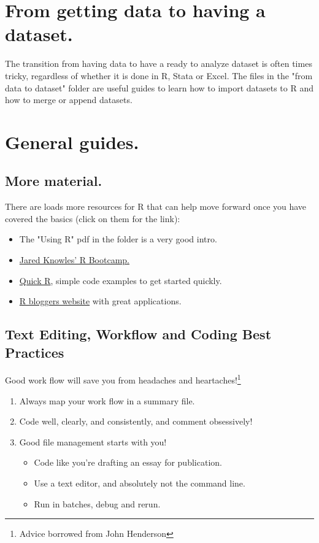 \documentclass[11pt,a4paper]{article}
\begin{document}
\section{From getting data to having a dataset.}
The transition from having data to have a ready to analyze dataset is often times tricky, regardless of whether it is done in R, Stata or Excel. 
The files in the "from data to dataset" folder are useful guides to learn how to import datasets to R and how to merge or append datasets. 

\newpage
\section{General guides.}
\subsection{More material.} 
There are loads more resources for R that can help move forward once you have covered the basics (click on them for the link):
\begin{itemize}
\item The "Using R" pdf in the folder is a very good intro. 
\item \href{http://jaredknowles.com/r-bootcamp}{Jared Knowles' R Bootcamp.}
\item \href{http://www.statmethods.net/}{Quick R}, simple code examples to get started quickly.
\item \href{http://www.r-bloggers.com/}{R bloggers website} with great applications. 
\end{itemize}

\subsection{Text Editing, Workflow and Coding Best Practices}
Good work flow will save you from headaches and heartaches!\footnote{Advice borrowed from John Henderson}
\begin{enumerate}
\item Always map your work flow in a summary file.
\item Code well, clearly, and consistently, and comment obsessively!
\item Good file management starts with you!
\begin{itemize}
\item Code like you're drafting an essay for publication.
\item Use a text editor, and absolutely not the command line.
\item Run in batches, debug and rerun.
\end{itemize}
\end{enumerate} 
\end{document}
